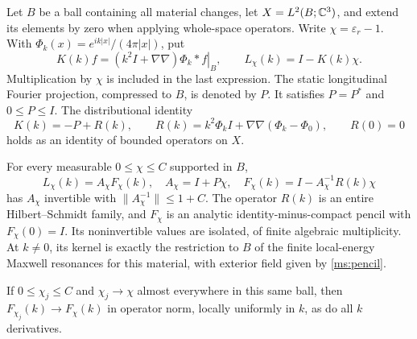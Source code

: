 Let $B$ be a ball containing all material changes, let
$X=L^2(B;\mathbb C^3)$, and extend its elements by zero when applying
whole-space operators.  Write $\chi=\varepsilon_r-1$.  With
$\Phi_k(x)=e^{ik|x|}/(4\pi|x|)$, put
\begin{equation}
 K(k)f=\left.(k^2I+\nabla\nabla)\Phi_k*f\right|_B,
 \qquad L_\chi(k)=I-K(k)\chi.
 \label{ms:pencil}
\end{equation}
Multiplication by $\chi$ is included in the last expression.
The static longitudinal Fourier projection, compressed to $B$, is
denoted by $P$.  It satisfies $P=P^*$ and $0\leq P\leq I$.
The distributional identity
\begin{equation}
 K(k)=-P+R(k),\qquad
 R(k)=k^2\Phi_k I+\nabla\nabla(\Phi_k-\Phi_0),\qquad R(0)=0
 \label{ms:compact-split}
\end{equation}
holds as an identity of bounded operators on $X$.

\begin{lemma}
\label{ms:fredholm}
For every measurable $0\leq\chi\leq C$ supported in $B$,
\begin{equation}
 L_\chi(k)=A_\chi F_\chi(k),\quad
 A_\chi=I+P\chi,\quad
 F_\chi(k)=I-A_\chi^{-1}R(k)\chi
 \label{ms:factorization}
\end{equation}
has $A_\chi$ invertible with $\|A_\chi^{-1}\|\leq1+C$.
The operator $R(k)$ is an entire Hilbert--Schmidt family, and
$F_\chi$ is an analytic identity-minus-compact pencil with
$F_\chi(0)=I$.  Its noninvertible values are isolated, of finite
algebraic multiplicity.  At $k\ne0$, its kernel is exactly the
restriction to $B$ of the finite local-energy Maxwell resonances
for this material, with exterior field given by \eqref{ms:pencil}.

If $0\leq\chi_j\leq C$ and $\chi_j\to\chi$ almost everywhere
in this same ball, then $F_{\chi_j}(k)\to F_\chi(k)$ in operator
norm, locally uniformly in $k$, as do all $k$ derivatives.
\end{lemma}


